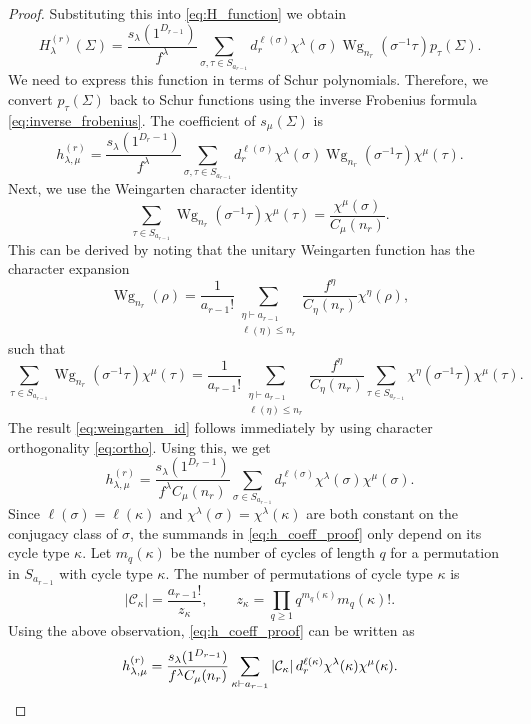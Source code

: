 \documentclass{article}
\theoremstyle{definition}
\DeclareMathOperator{\Wg}{Wg}
\begin{document}
\begin{proof}
Substituting this into \eqref{eq:H_function} we obtain
\[
H_\lambda^{(r)}(\Sigma)
=
\frac{s_\lambda(1^{D_{r-1}})}{f^\lambda}
\sum_{\sigma,\tau\in S_{a_{r-1}}}
d_r^{\ell(\sigma)}
\chi^\lambda(\sigma)
\Wg_{n_r}(\sigma^{-1}\tau)
p_\tau(\Sigma).
\]
We need to express this function in terms of Schur polynomials. Therefore, we convert \(p_\tau(\Sigma)\) back to Schur functions using the inverse Frobenius formula \eqref{eq:inverse_frobenius}. The coefficient of \(s_\mu(\Sigma)\) is
\[
h_{\lambda,\mu}^{(r)}
=
\frac{s_\lambda(1^{D_r-1})}{f^\lambda}
\sum_{\sigma,\tau\in S_{a_{r-1}}}
d_r^{\ell(\sigma)}
\chi^\lambda(\sigma)
\Wg_{n_r}(\sigma^{-1}\tau)
\chi^\mu(\tau).
\]
Next, we use the Weingarten character identity
\begin{equation}\label{eq:weingarten_id}
    \sum_{\tau\in S_{a_{r-1}}}
    \Wg_{n_r}(\sigma^{-1}\tau)\chi^\mu(\tau)
    =
    \frac{\chi^\mu(\sigma)}{C_\mu(n_r)}.
\end{equation}
This can be derived by noting that the unitary Weingarten function has the
character expansion \cite{Collins_2006,Collins_2017,Collins_2022}
\[
\Wg_{n_r}(\rho)
=
\frac1{a_{r-1}!}
\sum_{\substack{\eta\vdash a_{r-1}\\ \ell(\eta)\le n_r}}
\frac{f^\eta}{C_\eta(n_r)}
\chi^\eta(\rho),
\]
such that
\[
\sum_{\tau\in S_{a_{r-1}}}
\Wg_{n_r}(\sigma^{-1}\tau)\chi^\mu(\tau)
=
\frac1{a_{r-1}!}
\sum_{\substack{\eta\vdash a_{r-1}\\ \ell(\eta)\le n_r}}
\frac{f^\eta}{C_\eta(n_r)}
\sum_{\tau\in S_{a_{r-1}}}
\chi^\eta(\sigma^{-1}\tau)\chi^\mu(\tau).
\]
The result \eqref{eq:weingarten_id} follows immediately by using character orthogonality \eqref{eq:ortho}. Using this, we get
\begin{equation}\label{eq:h_coeff_proof}
    h_{\lambda,\mu}^{(r)}
=
\frac{s_\lambda(1^{D_r-1})}
{f^\lambda C_\mu(n_r)}
\sum_{\sigma\in S_{a_{r-1}}}
d_r^{\ell(\sigma)}
\chi^\lambda(\sigma)
\chi^\mu(\sigma).
\end{equation}
Since $\ell(\sigma)=\ell(\kappa)$ and $\chi^\lambda(\sigma) = \chi^\lambda(\kappa)$ are both constant on the conjugacy class of $\sigma$, the summands in \eqref{eq:h_coeff_proof} only depend on its cycle type $\kappa$. Let \(m_q(\kappa)\) be the number of cycles of length $q$ for a permutation in $S_{a_{r-1}}$ with cycle type $\kappa$. The number of  permutations of cycle
type $\kappa$ is
\begin{equation}\label{eq:C_k}
    |\mathcal C_\kappa|
=
\frac{a_{r-1}!}{z_\kappa},
\qquad
z_\kappa
=
\prod_{q\ge 1}q^{m_q(\kappa)}m_q(\kappa)!.
\end{equation}
Using the above observation, \eqref{eq:h_coeff_proof} can be written as
\[
h_{\lambda,\mu}^{(r)}
=
\frac{s_\lambda(1^{D_{r-1}})}
{f^\lambda C_\mu(n_r)}
\sum_{\kappa\vdash a_{r-1}}
|\mathcal C_\kappa|\,
d_r^{\ell(\kappa)}
\chi^\lambda(\kappa)\chi^\mu(\kappa). \qedhere
\]
\end{proof}
\end{document}
